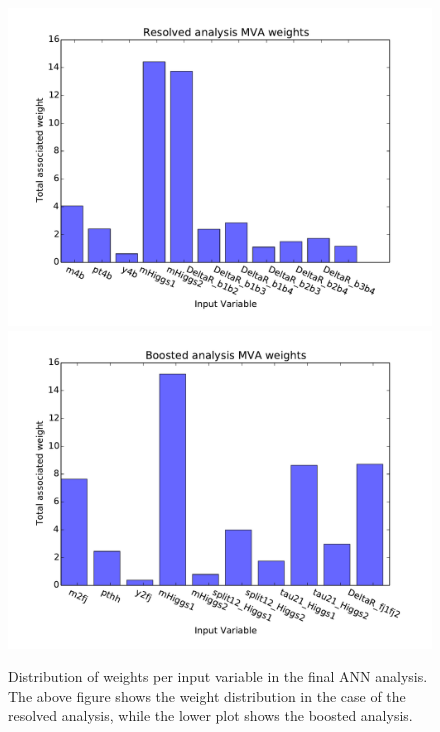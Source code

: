\documentclass[12pt]{article}
\begin{document}
\begin{figure}[h]
\begin{center}
\includegraphics[width=1\textwidth]{plots/nnweights_res.pdf}
\includegraphics[width=1\textwidth]{plots/nnweights_boost.pdf}
\caption{Distribution of weights per input variable in the final ANN analysis. The above figure shows the weight distribution in the case of the resolved analysis, while the lower plot shows the boosted analysis.}
\label{fig:nnweights}
\end{center}
\end{figure}
\clearpage
\end{document}
